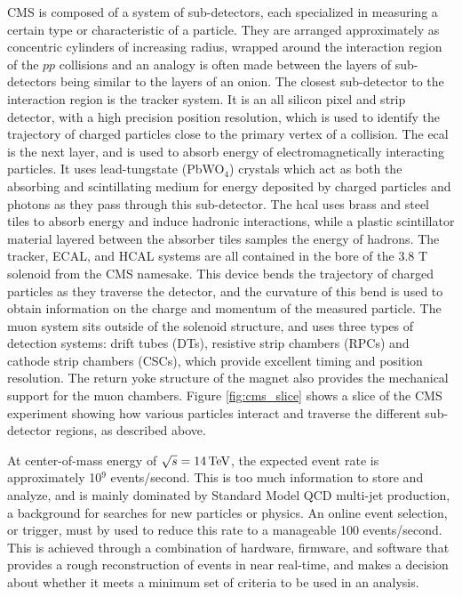 \par CMS is composed of a system of sub-detectors, each
specialized in measuring a certain type or characteristic of a
particle.  They are arranged approximately as concentric cylinders of
increasing radius, wrapped around the interaction region of the $pp$
collisions and an analogy is often made between the layers of
sub-detectors being similar to the layers of an onion. The closest 
sub-detector to the interaction region is the tracker system.  It is
an all silicon pixel and strip detector, with a high precision 
position resolution, which is used to identify the trajectory of
charged particles close to the primary vertex of a collision.  The
\acrfull{ecal} is the next layer, and is used to absorb energy of
electromagnetically interacting particles.  It uses lead-tungstate
(PbWO$_{4}$) crystals which act as both the absorbing and scintillating
medium for energy deposited by charged particles and photons as they
pass through  this sub-detector.  The \acrfull{hcal} uses brass and
steel tiles to absorb energy and induce hadronic interactions, while a
plastic scintillator material layered between the absorber tiles
samples the energy of hadrons.  The tracker, ECAL, and HCAL systems
are all contained in the bore of the 3.8 T solenoid from the CMS
namesake.  This device bends the trajectory of charged particles as
they traverse the detector, and the curvature of this bend is used to
obtain information on the charge and momentum of the measured
particle.  The muon system sits outside of the solenoid structure, and
uses three types of detection systems: drift tubes (DTs), resistive
strip chambers (RPCs) and cathode strip chambers (CSCs), which provide
excellent timing and position resolution.  The return yoke structure of
the magnet also provides the mechanical support for the muon
chambers.  Figure \ref{fig:cms_slice} shows a slice of the CMS
experiment showing how various particles interact and traverse the different
sub-detector regions, as described above.  

\par At center-of-mass energy of $\sqrt{s}=14 \,\text{Te\hspace{-.08em}V}$, the expected
event rate is approximately 10$^{9}$ events/second.  This is too much
information to store and analyze, and is mainly dominated by Standard
Model QCD multi-jet production, a background for searches for new
particles or physics.  An online event selection, or trigger, must by
used to reduce this rate to a manageable 100 events/second.  This is
achieved through a combination of hardware, firmware, and software
that provides a rough reconstruction of events in near real-time, and
makes a decision about whether it meets a minimum set of criteria to
be used in an analysis.  


